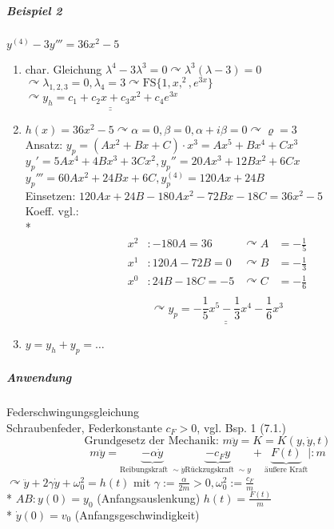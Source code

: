 \documentclass[a4paper]{scrartcl}
\begin{document}
\subparagraph{Beispiel 2} $y^{(4)} - 3y''' = 36x^2 -5$
\begin{enumerate}
\item char. Gleichung $\lambda^4 - 3\lambda^3 = 0 \curvearrowright \lambda^3 (\lambda -3)= 0 $\\
$\curvearrowright \lambda_{1,2,3} = 0, \lambda_4 = 3 \curvearrowright \text{FS} \{1,x,^2,e^{3x} \}$\\
$\curvearrowright \underline{\underline{y_h = c_1+c_2 x + c_3 x^2 + c_4 e^{3x}}}$
\item $h(x) = 36x^2 -5 \curvearrowright \alpha = 0, \beta = 0, \alpha + i \beta = 0 \curvearrowright \varrho = 3 $\\
Ansatz: $y_p = (Ax^2 + Bx +C ) \cdot x^3 = Ax^5 + Bx^4 + Cx^3$\\
$y_p' = 5Ax^4 + 4Bx^3 + 3Cx^2, y_p'' = 20Ax^3 + 12Bx^2 + 6Cx$\\
$y_p''' = 60Ax^2 + 24Bx + 6C, y_p^{(4)} = 120 Ax + 24B$\\
Einsetzen: $120Ax + 24B -180Ax^2 - 72Bx -18C  = 36x^2 -5$\\
Koeff. vgl.:\\*
\begin{align*} x^2 &: -180A = 36 &\curvearrowright A &= -\frac{1}{5}\\
x^1 &: 120A -72B = 0 &\curvearrowright B &= - \frac{1}{3}\\
x^0 &: 24B - 18C = -5 &\curvearrowright C &= -\frac{1}{6}\\
\end{align*}
\[ \curvearrowright \underline{\underline{y_p = -\frac{1}{5} x^5 - \frac{1}{3} x^4 - \frac{1}{6} x^3}} \]

\item $y= y_h +y_p = \dots$
\end{enumerate}

\subparagraph{Anwendung} Federschwingungsgleichung\\
Schraubenfeder, Federkonstante $c_F >0$, vgl. Bsp. 1 (7.1.)
\[ \text{Grundgesetz der Mechanik: } m\ddot{y}= K = K(y,\dot{y},t)\]
\[ m \ddot{y} = \underbrace{-\alpha \dot{y}}_{\text{Reibungskraft } \sim\dot{y}} \underbrace{-c_F y}_{\text{Rückzugskraft } \sim y} + \underbrace{F(t)}_{\text{äußere Kraft}} | : m\]
$\curvearrowright \ddot{y}  + 2 \gamma \dot{y} + \omega_0^2 = h(t)$ mit $\gamma := \frac{\alpha}{2m} > 0, \omega_0^2 := \frac{c_F}{m}$\\*
$AB: y(0) = y_0$ (Anfangsauslenkung) $h(t) = \frac{F(t)}{m}$\\*
$\dot{y}(0) = v_0$ (Anfangsgeschwindigkeit)
\end{document}
